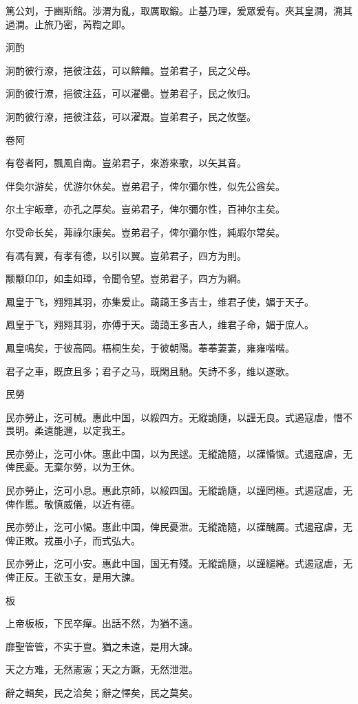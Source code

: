 篤公刘，于豳斯館。涉渭为亂，取厲取鍛。止基乃理，爰眾爰有。夾其皇澗，溯其過澗。止旅乃密，芮鞫之即。

泂酌

泂酌彼行潦，挹彼注茲，可以餴饎。豈弟君子，民之父母。

泂酌彼行潦，挹彼注茲，可以濯罍。豈弟君子，民之攸归。

泂酌彼行潦，挹彼注茲，可以濯溉。豈弟君子，民之攸墍。

卷阿

有卷者阿，飄風自南。豈弟君子，來游來歌，以矢其音。

伴奐尔游矣，优游尔休矣。豈弟君子，俾尔彌尔性，似先公酋矣。

尔土宇皈章，亦孔之厚矣。豈弟君子，俾尔彌尔性，百神尔主矣。

尔受命长矣，茀祿尔康矣。豈弟君子，俾尔彌尔性，純嘏尔常矣。

有馮有翼，有孝有德，以引以翼。豈弟君子，四方为則。

颙颙卬卬，如圭如璋，令聞令望。豈弟君子，四方为綱。

鳳皇于飞，翙翙其羽，亦集爰止。藹藹王多吉士，维君子使，媚于天子。

鳳皇于飞，翙翙其羽，亦傅于天。藹藹王多吉人，维君子命，媚于庶人。

鳳皇鳴矣，于彼高岡。梧桐生矣，于彼朝陽。菶菶萋萋，雍雍喈喈。

君子之車，既庶且多；君子之马，既閑且馳。矢詩不多，维以遂歌。

民勞

民亦勞止，汔可械。惠此中国，以綏四方。无縱詭隨，以謹无良。式遏寇虐，憯不畏明。柔遠能邇，以定我王。

民亦勞止，汔可小休。惠此中国，以为民逑。无縱詭隨，以謹惛怓。式遏寇虐，无俾民憂。无棄尔勞，以为王休。

民亦勞止，汔可小息。惠此京師，以綏四国。无縱詭隨，以謹罔極。式遏寇虐，无俾作慝。敬慎威儀，以近有德。

民亦勞止，汔可小愒。惠此中国，俾民憂泄。无縱詭隨，以謹醜厲。式遏寇虐，无俾正敗。戎虽小子，而式弘大。

民亦勞止，汔可小安。惠此中国，国无有殘。无縱詭隨，以謹繾綣。式遏寇虐，无俾正反。王欲玉女，是用大諫。

板

上帝板板，下民卒癉。出話不然，为猶不遠。

靡聖管管，不实于亶。猶之未遠，是用大諫。

天之方难，无然憲憲；天之方蹶，无然泄泄。

辭之輯矣，民之洽矣；辭之懌矣，民之莫矣。

